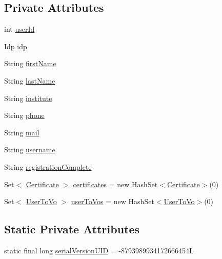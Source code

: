 \subsection*{Private Attributes}
\begin{DoxyCompactItemize}
\item 
int \hyperlink{classportal_1_1registration_1_1domain_1_1UserInfo_abbdfca0a8a809e1a28a5dd2e56874c1b}{userId}
\item 
\hyperlink{classportal_1_1registration_1_1domain_1_1Idp}{Idp} \hyperlink{classportal_1_1registration_1_1domain_1_1UserInfo_a9ee2008ca7555a9237135aedd8d0949b}{idp}
\item 
String \hyperlink{classportal_1_1registration_1_1domain_1_1UserInfo_a40352804afaf61b92208e4835ca8e5af}{firstName}
\item 
String \hyperlink{classportal_1_1registration_1_1domain_1_1UserInfo_a294fb84a68dad74ae5ed4e2186f5e460}{lastName}
\item 
String \hyperlink{classportal_1_1registration_1_1domain_1_1UserInfo_a71b2ba532eff8a9fb4fac4c000b3a8f3}{institute}
\item 
String \hyperlink{classportal_1_1registration_1_1domain_1_1UserInfo_af6775663ccce32e01fc070f1342f523f}{phone}
\item 
String \hyperlink{classportal_1_1registration_1_1domain_1_1UserInfo_a0433a86cea33aac5e724356012617157}{mail}
\item 
String \hyperlink{classportal_1_1registration_1_1domain_1_1UserInfo_ac3583a042c907bcce6ee84d3b2ee637d}{username}
\item 
String \hyperlink{classportal_1_1registration_1_1domain_1_1UserInfo_ab5145405b331d11672cd66053ceb012c}{registrationComplete}
\item 
Set$<$ \hyperlink{classportal_1_1registration_1_1domain_1_1Certificate}{Certificate} $>$ \hyperlink{classportal_1_1registration_1_1domain_1_1UserInfo_a5923ed9351bde36f580647933f7b3fe0}{certificates} = new HashSet$<$\hyperlink{classportal_1_1registration_1_1domain_1_1Certificate}{Certificate}$>$(0)
\item 
Set$<$ \hyperlink{classportal_1_1registration_1_1domain_1_1UserToVo}{UserToVo} $>$ \hyperlink{classportal_1_1registration_1_1domain_1_1UserInfo_a334522ed169ed1e54ac676a31b0cc701}{userToVos} = new HashSet$<$\hyperlink{classportal_1_1registration_1_1domain_1_1UserToVo}{UserToVo}$>$(0)
\end{DoxyCompactItemize}
\subsection*{Static Private Attributes}
\begin{DoxyCompactItemize}
\item 
static final long \hyperlink{classportal_1_1registration_1_1domain_1_1UserInfo_aea84836830b4057e574b59aad5679de8}{serialVersionUID} = -\/8793989934172666454L
\end{DoxyCompactItemize}


